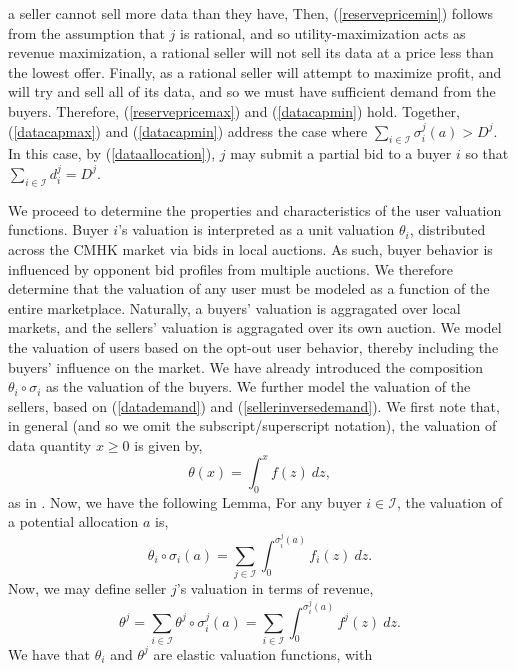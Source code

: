 \documentclass[12pt]{article}
\theoremstyle{definition}
\newcommand{\mcI}{\mathcal{I}}
\newcommand{\g}{\sigma}
\begin{document}
\begin{multicols}{2}
a seller cannot sell more data than they have,
Then, (\ref{reservepricemin})
follows from the assumption that $j$ is rational, and so utility-maximization
acts as revenue maximization, a rational seller will not sell its
data at a price less than the lowest offer. Finally, as a rational seller will
attempt to maximize profit, and will try and sell all of its data, and so we
must have sufficient demand
from the buyers. Therefore, (\ref{reservepricemax}) and (\ref{datacapmin}) hold. Together, (\ref{datacapmax}) and
(\ref{datacapmin}) address the case where $\sum_{i\in\mcI} \g_i^j(a) >  D^j$. In
this case, by (\ref{dataallocation}), $j$ may submit a partial bid to a buyer
$i$ so that $\sum_{i\in\mcI} d^j_i = D^j$.

We proceed to determine the properties and characteristics of the user valuation functions. Buyer $i$'s valuation is interpreted as a unit valuation $\theta_i$,
distributed across the CMHK market via bids in local auctions. 
As such, buyer behavior is influenced by opponent bid profiles from multiple auctions.
We therefore determine that the valuation of any user must be modeled as a function of the entire
marketplace. Naturally, a buyers' valuation is aggragated over local markets, and the
sellers' valuation is aggragated over its own auction. We model the valuation of
users based on the opt-out user behavior, thereby including the buyers'
influence on the market. We have already introduced the composition $\theta_i
\circ \g_i$ as the valuation of the buyers. We further model the valuation of the sellers, based on
(\ref{datademand}) and (\ref{sellerinversedemand}). We first note that, in
general (and so we omit the subscript/superscript notation), the valuation of data quantity $x\ge 0$ is given by,
$$
    \theta(x) = \int_0^x f(z) \ dz,
$$ 
as in \cite{semret}. Now, we have the following Lemma,
{
\label{uservaluation}
For any buyer $i\in\mcI$, the valuation of a potential
allocation $a$ is, 
\begin{equation}\label{buyervaluation}
    \theta_i \circ \g_i(a) = \displaystyle\sum_{j\in\mcI}
 \int_0^{\g_i^j(a)} f_i(z) \ dz.
\end{equation}
Now, we may define seller $j$'s valuation in terms of revenue,
\begin{equation}\label{sellervaluation}
    \theta^j= \displaystyle\sum_{i\in\mcI} \theta^j \circ \g_i^j(a) = \sum_{i\in\mcI}
 \int_0^{\g_i^j(a)} f^j(z) \ dz.
\end{equation}
We have that $\theta_i$ and $\theta^j$ are elastic valuation functions, with
}
\end{multicols}
\end{document}
